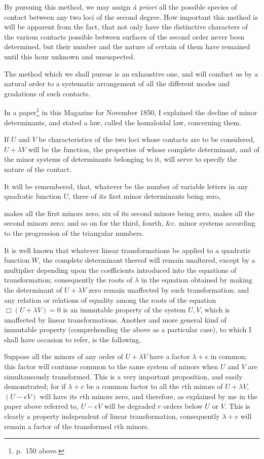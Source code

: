 \documentclass[11pt]{article}
\newcommand{\sourcepage}[1]{\marginpar{\scriptsize p.~#1}}
\begin{document}
{{By pursuing this method, we may assign \emph{à priori} all the possible species of contact between any two loci of the second degree. How important this method is will be apparent from the fact, that not only have the distinctive characters of the various contacts possible between surfaces of the second order never been determined, but their number and the nature of certain of them have remained until this hour unknown and unsuspected.

The method which we shall pursue is an exhaustive one, and will conduct us by a natural order to a systematic arrangement of all the different modes and gradations of such contacts.

In a paper\footnote{p.~150 above.} in this Magazine for November 1850, I explained the decline of minor determinants, and stated a law, called the homaloidal law, concerning them.

If $U$ and $V$ be characteristics of the two loci whose contacts are to be considered, $U+\lambda V$ will be the function, the properties of whose complete determinant, and of the minor systems of determinants belonging to it, will serve to specify the nature of the contact.

It will be remembered, that, whatever be the number of variable letters in any quadratic function $U$, three of its first minor determinants being zero,

\sourcepage{221}
makes all the first minors zero; six of its second minors being zero, makes all the second minors zero; and so on for the third, fourth, \&c. minor systems according to the progression of the triangular numbers.

It is well known that whatever linear transformations be applied to a quadratic function $W$, the complete determinant thereof will remain unaltered, except by a multiplier depending upon the coefficients introduced into the equations of transformation; consequently the roots of $\lambda$ in the equation obtained by making the determinant of $U+\lambda V$ zero remain unaffected by such transformation; and any relation or relations of equality among the roots of the equation $\Box(U+\lambda V)=0$ is an immutable property of the system $U,V$, which is unaffected by linear transformations. Another and more general kind of immutable property (comprehending the above as a particular case), to which I shall have occasion to refer, is the following.

Suppose all the minors of any order of $U+\lambda V$ have a factor $\lambda+e$ in common; this factor will continue common to the same system of minors when $U$ and $V$ are simultaneously transformed. This is a very important proposition, and easily demonstrated; for if $\lambda+e$ be a common factor to all the $r$th minors of $U+\lambda V$, $(U-eV)$ will have its $r$th minors zero, and therefore, as explained by me in the paper above referred to, $U-eV$ will be degraded $r$ orders below $U$ or $V$. This is clearly a property independent of linear transformation, consequently $\lambda+e$ will remain a factor of the transformed $r$th minors.

}}
\end{document}

